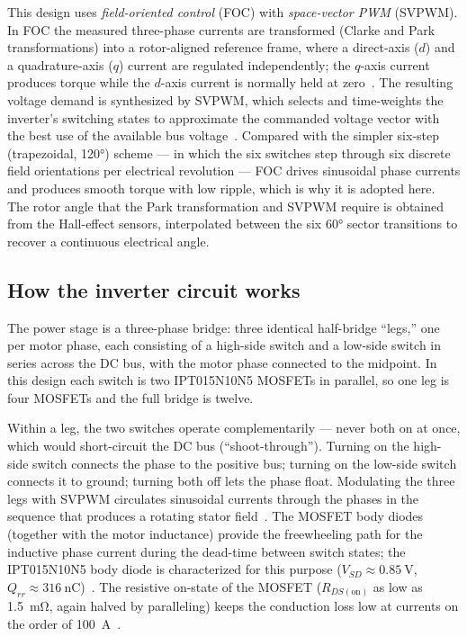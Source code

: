 \documentclass[journal,onecolumn,11pt]{IEEEtran}
\newcommand{\Rdson}{R_{DS(\mathrm{on})}}
\begin{document}
This design uses \emph{field-oriented control} (FOC) with \emph{space-vector PWM} (SVPWM). In FOC
the measured three-phase currents are transformed (Clarke and Park transformations) into a
rotor-aligned reference frame, where a direct-axis ($d$) and a quadrature-axis ($q$) current are
regulated independently; the $q$-axis current produces torque while the $d$-axis current is
normally held at zero~\cite{ti_foc}. The resulting voltage demand is synthesized by SVPWM, which
selects and time-weights the inverter's switching states to approximate the commanded voltage
vector with the best use of the available bus voltage~\cite{ti_svpwm}. Compared with the simpler
six-step (trapezoidal, \ang{120}) scheme --- in which the six switches step through six discrete
field orientations per electrical revolution --- FOC drives sinusoidal phase currents and produces
smooth torque with low ripple, which is why it is adopted here. The rotor angle that the Park
transformation and SVPWM require is obtained from the Hall-effect sensors, interpolated between the
six \ang{60} sector transitions to recover a continuous electrical angle.

\subsection{How the inverter circuit works}
The power stage is a three-phase bridge: three identical half-bridge ``legs,'' one per motor phase,
each consisting of a high-side switch and a low-side switch in series across the DC bus, with the
motor phase connected to the midpoint. In this design each switch is two IPT015N10N5 MOSFETs in
parallel, so one leg is four MOSFETs and the full bridge is twelve.

Within a leg, the two switches operate complementarily --- never both on at once, which would
short-circuit the DC bus (``shoot-through''). Turning on the high-side switch connects the phase to
the positive bus; turning on the low-side switch connects it to ground; turning both off lets the
phase float. Modulating the three legs with SVPWM circulates sinusoidal currents through the phases
in the sequence that produces a rotating stator field~\cite{ti_svpwm}. The MOSFET body diodes
(together with the motor inductance) provide the freewheeling path for the inductive phase current
during the dead-time between switch states; the IPT015N10N5 body diode is characterized for this
purpose ($V_{SD}\approx\SI{0.85}{\volt}$, $Q_{rr}\approx\SI{316}{\nano\coulomb}$)~\cite{ipt015ds}.
The resistive on-state of the MOSFET ($\Rdson$ as low as \SI{1.5}{\milli\ohm}, again halved by
paralleling) keeps the conduction loss low at currents on the order of \SI{100}{\ampere}~\cite{ipt015ds,balogh}.
\end{document}
